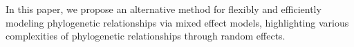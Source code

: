 \documentclass[12pt]{article}
\begin{document}
In this paper, we propose an alternative method for flexibly and efficiently modeling phylogenetic relationships via mixed effect models, highlighting various complexities of phylogenetic relationships through random effects.
\end{document}
